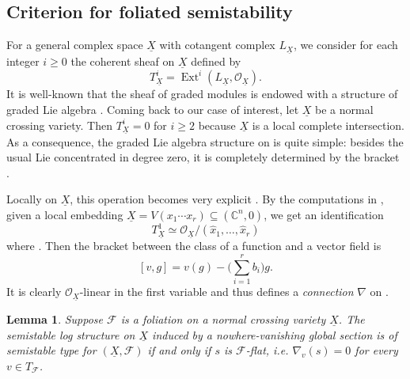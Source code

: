 \documentclass[reqno]{amsart}
\newcommand\C{\mathbb{C}}
\newcommand{\OO}{\mathcal{O}}
\newcommand{\F}{\mathscr{F}}
\DeclareMathOperator{\Ext}{Ext}
\newtheorem{lemma}[theorem]{Lemma}
\theoremstyle{definition}
\theoremstyle{named}
\begin{document}
\subsection{Criterion for foliated semistability} For a general complex space $\underline{X}$ with cotangent complex $L_{\underline{X}}$, we consider for each integer $i\geqslant 0$ the coherent sheaf on $\underline{X}$ defined by
$$T_{\underline{X}}^i = \Ext^i(L_{\underline{X}},\OO_{\underline{X}}).$$
It is well-known that the sheaf of graded modules  is endowed with a structure of graded Lie algebra  \cite{schlessinger1985lie}. Coming back to our case of interest, let $\underline{X}$ be a normal crossing variety. Then  $T_{\underline{X}}^i = 0$ for $i\geqslant 2$ because $\underline{X}$ is a local complete intersection. As a consequence, the graded Lie algebra structure on  is quite simple: besides the usual Lie concentrated in degree zero, it is completely determined by the bracket . 

Locally on $\underline{X}$, this operation becomes very explicit \cite[Section 4]{friedman1983global}. By the computations in \cite[Section 3.1]{sernesi2007deformations}, given a local embedding $\underline{X}= V(x_1\cdots x_r) \subseteq (\C^n,0)$,  we get an identification
\[
T^1_{\underline{X}} \simeq \OO_{\underline{X}}/(\hat{x}_1,\dots, \hat{x}_r)
\]
where . Then the bracket between the class of a function  and a vector field  is 
\begin{equation} \label{eq: nabla_dual}
[v,g] =   v(g)-\bigg(\sum_{i=1}^rb_i\bigg) g.
\end{equation}
It is clearly $\OO_{\underline{X}}$-linear in the first variable and thus defines a \textit{connection} $\nabla$ on .


\begin{lemma}\label{lema: connection}
Suppose $\F$ is a foliation on a normal crossing variety $\underline{X}$. The semistable log structure on $\underline{X}$ induced by a nowhere-vanishing global section  is of semistable type for $(\underline{X},\F)$ if and only if  $s$ is \textit{$\F$-flat}, i.e. $\nabla_v(s)=0$ for every $v\in T_\F$.
\end{lemma}
\end{document}
